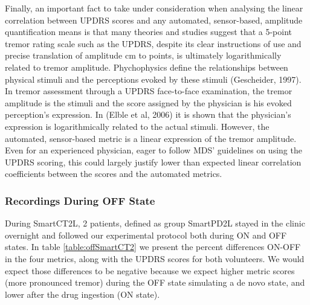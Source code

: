 Finally, an important fact to take under consideration when analysing the linear correlation between \gls{UPDRS} scores and any automated, sensor-based, amplitude quantification means is that many theories and studies suggest that a 5-point tremor rating scale such as the \gls{UPDRS}, despite its clear instructions of use and precise translation of amplitude cm to points, is ultimately logarithmically related to tremor amplitude. Phychophysics define the relationships between physical stimuli and the perceptions evoked by these stimuli (Gescheider, 1997). In tremor assessment through a \gls{UPDRS} face-to-face examination, the tremor amplitude is the stimuli and the score assigned by the physician is his evoked perception's expression. In (Elble et al, 2006) it is shown that the physician's expression is logarithmically related to the actual stimuli. However, the automated, sensor-based metric is a linear expression of the tremor amplitude. Even for an experienced physician, eager to follow \gls{MDS}' guidelines on using the \gls{UPDRS} scoring, this could largely justify lower than expected linear correlation coefficients between the scores and the automated metrics. 

\subsubsection{Recordings During OFF State}
\label{subsubsec:SmartCT2OFF}
During \gls{SmartCT2L}, 2 patients, defined as group \gls{SmartPD2L} stayed in the clinic overnight and followed our experimental protocol both during ON and OFF states. In table \ref{table:offSmartCT2} we present the percent differences ON-OFF in the four metrics, along with the \gls{UPDRS} scores for both volunteers. We would expect those differences to be negative because we expect higher metric scores (more pronounced tremor) during the OFF state simulating a de novo state, and lower after the drug ingestion (ON state). 

